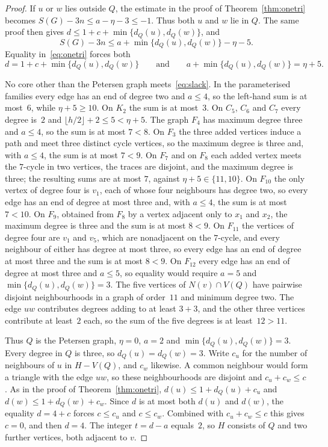 \documentclass[ASNA]{USG}
\theoremstyle{WBstyletwo}
\numberwithin{equation}{section}
\begin{document}
\begin{proof}
If $u$ or $w$ lies outside $Q$, the estimate in the proof of Theorem~\ref{thm:onetri} becomes $S(G)-3n\le a-\eta-3\le -1$. Thus both $u$ and $w$ lie in $Q$. The same proof then gives $d\le 1+c+\min\{d_Q(u),d_Q(w)\}$, and
\[
S(G)-3n\le a+\min\{d_Q(u),d_Q(w)\}-\eta-5.
\]
Equality in~\eqref{eq:onetri} forces both
\begin{equation}\label{eq:slack}
d=1+c+\min\{d_Q(u),d_Q(w)\}
\qquad\text{and}\qquad
a+\min\{d_Q(u),d_Q(w)\}=\eta+5.
\end{equation}

No core other than the Petersen graph meets~\eqref{eq:slack}. In the parameterised families every edge has an end of degree two and $a\le 4$, so the left-hand sum is at most~$6$, while $\eta+5\ge 10$. On $K_2$ the sum is at most~$3$. On $C_5$, $C_6$ and $C_7$ every degree is~$2$ and $\lfloor h/2\rfloor+2\le 5<\eta+5$. The graph $F_4$ has maximum degree three and $a\le 4$, so the sum is at most $7<8$. On $F_3$ the three added vertices induce a path and meet three distinct cycle vertices, so the maximum degree is three and, with $a\le 4$, the sum is at most $7<9$. On $F_7$ and on $F_8$ each added vertex meets the $7$-cycle in two vertices, the traces are disjoint, and the maximum degree is three; the resulting sums are at most $7$, against $\eta+5\in\{11,10\}$. On $F_{10}$ the only vertex of degree four is $v_1$, each of whose four neighbours has degree two, so every edge has an end of degree at most three and, with $a\le 4$, the sum is at most $7<10$. On $F_9$, obtained from $F_8$ by a vertex adjacent only to $x_1$ and $x_2$, the maximum degree is three and the sum is at most $8<9$. On $F_{11}$ the vertices of degree four are $v_1$ and $v_5$, which are nonadjacent on the $7$-cycle, and every neighbour of either has degree at most three, so every edge has an end of degree at most three and the sum is at most $8<9$. On $F_{12}$ every edge has an end of degree at most three and $a\le 5$, so equality would require $a=5$ and $\min\{d_Q(u),d_Q(w)\}=3$. The five vertices of $N(v)\cap V(Q)$ have pairwise disjoint neighbourhoods in a graph of order~$11$ and minimum degree two. The edge $uw$ contributes degrees adding to at least $3+3$, and the other three vertices contribute at least~$2$ each, so the sum of the five degrees is at least~$12>11$.

Thus $Q$ is the Petersen graph, $\eta=0$, $a=2$ and $\min\{d_Q(u),d_Q(w)\}=3$. Every degree in $Q$ is three, so $d_Q(u)=d_Q(w)=3$. Write $c_u$ for the number of neighbours of $u$ in $H-V(Q)$, and $c_w$ likewise. A common neighbour would form a triangle with the edge $uw$, so these neighbourhoods are disjoint and $c_u+c_w\le c$. As in the proof of Theorem~\ref{thm:onetri}, $d(u)\le 1+d_Q(u)+c_u$ and $d(w)\le 1+d_Q(w)+c_w$. Since $d$ is at most both $d(u)$ and $d(w)$, the equality $d=4+c$ forces $c\le c_u$ and $c\le c_w$. Combined with $c_u+c_w\le c$ this gives $c=0$, and then $d=4$. The integer $t=d-a$ equals~$2$, so $H$ consists of $Q$ and two further vertices, both adjacent to $v$.


\end{proof}
\end{document}
